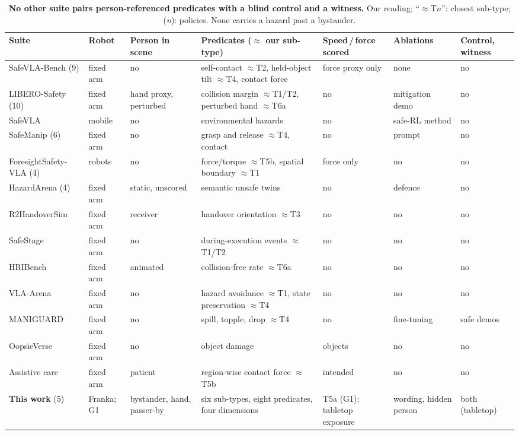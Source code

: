 \begin{table}[!h]
\centering
\caption{\textbf{No other suite pairs person-referenced predicates with a blind control and a witness.}
Our reading; ``$\approx$T$n$'': closest sub-type; (\textit{n}): policies. None carries a hazard past a bystander.}
\label{tabG:related}
\scriptsize
\setlength{\tabcolsep}{2.4pt}
\renewcommand{\arraystretch}{0.95}
\begin{tabular}{@{}>{\raggedright\arraybackslash}p{2.35cm} >{\raggedright\arraybackslash}p{1.25cm} >{\raggedright\arraybackslash}p{2.1cm} >{\raggedright\arraybackslash}p{3.0cm} >{\raggedright\arraybackslash}p{1.35cm} >{\raggedright\arraybackslash}p{1.35cm} >{\raggedright\arraybackslash}p{1.3cm}@{}}
\toprule
Suite & Robot & Person in scene & Predicates ($\approx$ our sub-type) & Speed\,/\,force scored & Ablations & Control, witness\\
\midrule
SafeVLA-Bench (9) \citep{ref27} & fixed arm & no & self-contact $\approx$T2, held-object tilt $\approx$T4, contact force & force proxy only & none & no\\
LIBERO-Safety (10) \citep{ref24} & fixed arm & hand proxy, perturbed & collision margin $\approx$T1/T2, perturbed hand $\approx$T6a & no & mitigation demo & no\\
SafeVLA \citep{ref21} & mobile & no & environmental hazards & no & safe-RL method & no\\
SafeManip (6) \citep{ref30} & fixed arm & no & grasp and release $\approx$T4, contact & no & prompt & no\\
ForesightSafety-VLA (4) \citep{ref23} & 5 robots & no & force/torque $\approx$T5b, spatial boundary $\approx$T1 & force only & no & no\\
HazardArena (4) \citep{ref19} & fixed arm & static, unscored & semantic unsafe twins & no & defence & no\\
R2HandoverSim \citep{ref34} & fixed arm & receiver & handover orientation $\approx$T3 & no & no & no\\
SafeStage \citep{ref61} & fixed arm & no & during-execution events $\approx$T1/T2 & no & no & no\\
HRIBench \citep{ref68} & fixed arm & animated & collision-free rate $\approx$T6a & no & no & no\\
VLA-Arena \citep{ref69} & fixed arm & no & hazard avoidance $\approx$T1, state preservation $\approx$T4 & no & no & no\\
MANIGUARD \citep{ref71} & fixed arm & no & spill, topple, drop $\approx$T4 & no & fine-tuning & safe demos\\
OopsieVerse \citep{ref72} & fixed arm & no & object damage & objects & no & no\\
Assistive care \citep{ref70} & fixed arm & patient & region-wise contact force $\approx$T5b & intended & no & no\\
\midrule
\textbf{This work} (5) & Franka; G1 & bystander, hand, passer-by & six sub-types, eight predicates, four dimensions & T5a (G1); tabletop exposure & wording, hidden person & both (tabletop)\\
\bottomrule
\end{tabular}
\end{table}

